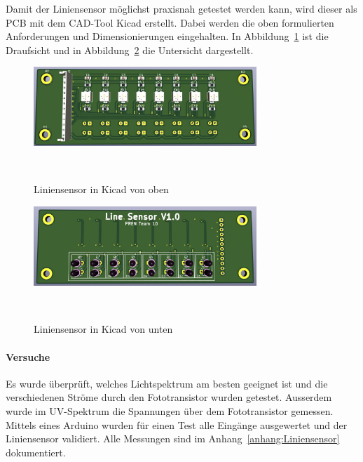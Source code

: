 \documentclass[main.tex]{subfiles} %
\begin{document}
Damit der Liniensensor möglichst praxisnah getestet 
werden kann, wird dieser als PCB mit dem CAD-Tool Kicad erstellt. Dabei werden die 
oben formulierten Anforderungen und Dimensionierungen eingehalten. In Abbildung~\ref{fig:Liniensensor_Top} 
ist die Draufsicht und in Abbildung~\ref{fig:Liniensensor_Bottom} die Untersicht dargestellt.

\begin{figure}[H]
    \centering
    \includegraphics[width=0.75\textwidth]{fig_Strecke_Tracken/Liniensensor_Top.pdf}
    \caption{Liniensensor in Kicad von oben}~\label{fig:Liniensensor_Top}
\end{figure}

\begin{figure}[H]
    \centering
    \includegraphics[width=0.75\textwidth]{fig_Strecke_Tracken/Liniensensor_Bottom.pdf}
    \caption{Liniensensor in Kicad von unten}~\label{fig:Liniensensor_Bottom}
\end{figure}





\paragraph{Versuche}
Es wurde überprüft, welches Lichtspektrum am besten geeignet ist und die verschiedenen Ströme
durch den Fototransistor wurden getestet. Ausserdem wurde im UV-Spektrum die Spannungen über dem Fototransistor
gemessen. Mittels eines 
Arduino wurden für einen Test alle Eingänge ausgewertet und der Liniensensor validiert. 
Alle Messungen sind im Anhang~\ref{anhang:Liniensensor} dokumentiert.

\end{document}
